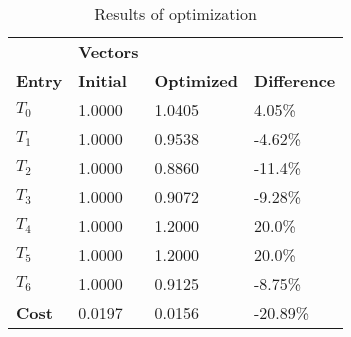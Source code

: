\begin{table}[h!]
\centering
\begin{tabular}{llll}
\textbf{}      & \cellcolor[HTML]{EFEFEF}\textbf{Vectors} & \textbf{} & \textbf{}         \\
\rowcolor[HTML]{EFEFEF} 
\textbf{Entry} & \textbf{Initial} & \textbf{Optimized} & \textbf{Difference} \\
$T_0$ & 1.0000 & 1.0405 & 4.05\% \\ 
$T_1$ & 1.0000 & 0.9538 & -4.62\% \\ 
$T_2$ & 1.0000 & 0.8860 & -11.4\% \\ 
$T_3$ & 1.0000 & 0.9072 & -9.28\% \\ 
$T_4$ & 1.0000 & 1.2000 & 20.0\% \\ 
$T_5$ & 1.0000 & 1.2000 & 20.0\% \\ 
$T_6$ & 1.0000 & 0.9125 & -8.75\% \\ 
\rowcolor[HTML]{EFEFEF} 
\textbf{Cost}  & 0.0197 & 0.0156 & -20.89\% \\ 
\end{tabular}
\caption{Results of optimization}
\label{tab:OptimizationAnalysis}
\end{table}
